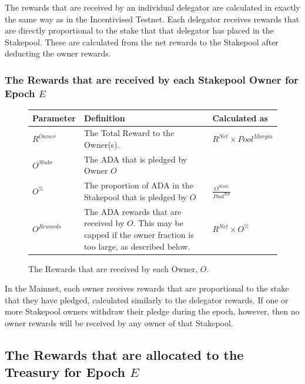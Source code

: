 \documentclass[11pt,a4paper,dvipsnames,twosided,final]{article}
\newcommand{\khcomment}[1]{\todo[color=blue!20]{KH: #1}}
\newcommand{\ada}{ADA{}}
\begin{document}
\noindent
The rewards that are received by an individual delegator are calculated in exactly the same way as in
the Incentivised Testnet.  Each delegator receives rewards that are directly proportional to the
stake that that delegator has placed in the Stakepool.  These are calculated from the net rewards to the
Stakepool after deducting the owner rewards.

\subsubsection*{The Rewards that are received by each Stakepool Owner for Epoch $E$}


\begin{figure}[h!]
\begin{center}
\begin{tabular}{||l|p{9cm}|l||}
  \hline \hline
\textbf{Parameter}  & \textbf{Definition} & \textbf{Calculated as} \\\hline
$R^\textit{Owner}$ & The Total Reward to the Owner(s).  & $R^{\textit{Net}} \times {\textit{Pool}}^{\textit{Margin}}$ \\\hline
$O^\textit{Stake}$ & The \ada{} that is pledged by Owner $O$ & \\\hline
$O^\%$ & The proportion of \ada{} in the Stakepool that is pledged by $O$ & $\frac{O^{Stake}}{Pool^{Tot}}$ \\\hline
$O^{Rewards}$ & The \ada{} rewards that are received by $O$. This may be capped if the owner fraction is too large,
as described below. & $R^{\textit{Net}} \times O^\%$ \\\hline
\hline
\end{tabular}
\end{center}
\caption{The Rewards that are received by each Owner, $O$.}
\end{figure}

\noindent
In the Mainnet, each owner receives rewards that are proportional to the stake that they have pledged,
calculated similarly to the delegator rewards.  If one or more Stakepool owners withdraw their pledge during the epoch,
however, then no owner rewards will be received by any owner of that Stakepool.


\clearpage
\subsection{The Rewards that are allocated to the Treasury for Epoch $E$}
\end{document}
